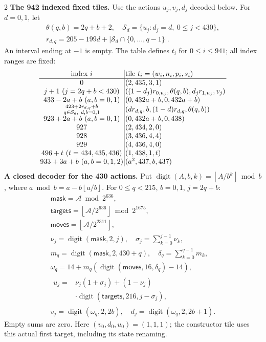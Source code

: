 \documentclass[10pt]{article}
\newcommand{\fl}[1]{\left\lfloor#1\right\rfloor}
\newcommand{\rg}[2]{\{#1,\ldots,#2\}}
\begin{document}
\begin{multicols}{2}
\textbf{The 942 indexed fixed tiles.}
Use the actions $u_j,v_j,d_j$ decoded below. For $d=0,1$, let
\[
\begin{gathered}
\theta(q,b)=2q+b+2,\quad
\mathcal S_d=\{u_j:d_j=d,\ 0\le j<430\},\\
r_{d,q}=205-199d+|\mathcal S_d\cap\rg0{q-1}|.
\end{gathered}
\]
An interval ending at $-1$ is empty. The table defines $t_i$ for
$0\le i\le941$; all index ranges are fixed:
\[
\setlength{\arraycolsep}{1.4pt}\begin{array}{c|l}
\text{index }i&\text{tile }t_i=(w_i,n_i,p_i,s_i)\\\hline
0&(2,435,3,1)\\
j+1\ (j=2q+b<430)&((1-d_j)r_{0,u_j},\theta(q,b),d_jr_{1,u_j},v_j)\\
433-2a+b\ (a,b=0,1)&(0,432a+b,0,432a+b)\\
\substack{423+2r_{d,q}+b\\q\in\mathcal S_d,\ d,b=0,1}&(dr_{d,q},b,(1-d)r_{d,q},\theta(q,b))\\
923+2a+b\ (a,b=0,1)&(0,432a+b,0,438)\\
927&(2,434,2,0)\\
928&(3,436,4,4)\\
929&(4,436,4,0)\\
496+t\ (t=434,435,436)&(1,438,1,t)\\
933+3a+b\ (a,b=0,1,2)&(a^2,437,b,437)
\end{array}
\]
\textbf{A closed decoder for the 430 actions.}
Put $\operatorname{digit}(A,b,k)=\fl{A/b^k}\bmod b$, where
$a\bmod b=a-b\fl{a/b}$. For $0\le q<215$, $b=0,1$, $j=2q+b$:
\[
\begin{gathered}
\mathsf{mask}=\mathcal A\bmod2^{636},\\
\mathsf{targets}=\fl{\mathcal A/2^{636}}\bmod2^{1675},\\
\mathsf{moves}=\fl{\mathcal A/2^{2311}},\\
\nu_j=\operatorname{digit}(\mathsf{mask},2,j),\quad \sigma_j=\sum_{k=0}^{j-1}\nu_k,\\
m_q=\operatorname{digit}(\mathsf{mask},2,430+q),\quad \delta_q=\sum_{k=0}^{q-1}m_k,\\
\omega_q=14+m_q(\operatorname{digit}(\mathsf{moves},16,\delta_q)-14),\\
\begin{aligned}
u_j={}&\nu_j(1+\sigma_j)+(1-\nu_j)\\
&\cdot\operatorname{digit}(\mathsf{targets},216,j-\sigma_j),
\end{aligned}\\
v_j=\operatorname{digit}(\omega_q,2,2b),\quad d_j=\operatorname{digit}(\omega_q,2,2b+1).
\end{gathered}
\]
Empty sums are zero. Here $(v_0,d_0,u_0)=(1,1,1)$; the constructor tile
uses this actual first target, including its state renaming.


\end{multicols}
\end{document}
